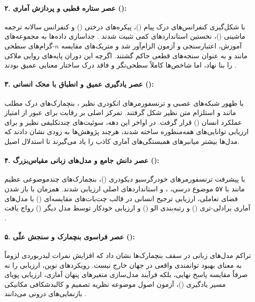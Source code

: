 \paragraph*{۲. عصر ستاره قطبی و پردازش آماری ():}
با شکل‌گیری کنفرانس‌های درک پیام ()، پیکره‌های درختی () و کنفرانس سالانه ترجمه ماشینی ()، نخستین استانداردهای کمی تثبیت شدند \cite{kreutzer2025deja}. جداسازی داده‌ها به مجموعه‌های آموزش، اعتبارسنجی و آزمون الزام‌آور شد و متریک‌های مقایسه $n$-گرام‌های سطحی مانند  \cite{papineni2002bleu} و  \cite{lin2004rouge} به عنوان سنجه‌های قطعی حاکم گشتند. اگرچه این دوران پایه‌های روایی ملاکی را بنا نهاد، اما شاخص‌ها کاملاً سطحی‌نگر و فاقد درک ساختار معنایی عمیق بودند \cite{zaghouani2026position}.

\paragraph*{۳. عصر یادگیری عمیق و انطباق با محک انسانی ():}
با ظهور شبکه‌های عصبی و ترنسفورمرهای انکودری نظیر  \cite{devlin2019bert}، بنچمارک‌های درک مطلب مانند  \cite{rajpurkar2016squad} و استلزام متن نظیر  \cite{bowman2015large} شکل گرفتند. تمرکز اصلی بر رقابت برای عبور از امتیاز عملکرد انسان () قرار گرفت. در اواخر این دهه، سوئیت‌های چندتکلیفی نظیر  \cite{wang2018glue} و  \cite{wang2019superglue} برای ارزیابی توانایی‌های همه‌منظوره ساخته شدند، هرچند پژوهش‌ها به زودی نشان دادند که مدل‌ها بیشتر میانبرهای همبستگی‌های آماری کاذب را یاد می‌گیرند تا استدلال اصیل.

\paragraph*{۴. عصر دانش جامع و مدل‌های زبانی مقیاس‌بزرگ ():}
با پیشرفت ترنسفورمرهای خودرگرسیو دیکودری ()، بنچمارک‌های چندموضوعی عظیم مانند  \cite{hendrycks2020measuring} با ۵۷ موضوع درسی،  \cite{srivastava2022beyond}،  \cite{cobbe2021training} و  \cite{rein2024gpqa} استانداردهای اصلی ارزیابی شدند. همزمان با باز شدن فضای تعاملی، ارزیابی ترجیح انسانی در قالب چت‌بات‌های مقایسه‌ای () با مدل‌های آماری برادلی-تری () و رتبه‌بندی الو () و ارزیابی خودکار توسط مدل دیگر () رواج یافت \cite{zheng2023judging}.

\paragraph*{۵. عصر فراسوی بنچمارک و سنجش علّی ():}
تراکم مدل‌های زبانی در سقف بنچمارک‌ها نشان داد که افزایش نمرات لیدربوردی لزوماً به معنای بهبود توانمندی واقعی در جهان خارج نیست. رویکردهای نوین، ارزیابی را نه صرفاً مقایسه پاسخ نهایی، بلکه فرآیند مدل‌سازی متغیرهای پنهان آماری، ارزیابی پویای مسیر یادگیری ()، آزمون اصول موضوعه نظریه تصمیم و کالبدشکافی مکانیکی بازنمایی‌های درونی می‌دانند \cite{xu2026latency, song2026benchmarking, boughorbel2025beyond}.

